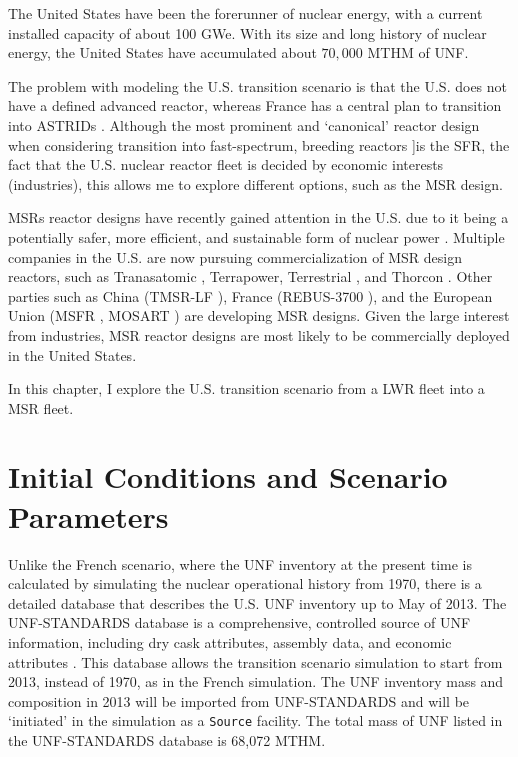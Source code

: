 
The United States have been the forerunner of nuclear energy, with a current
installed capacity of about 100 GWe. With its size and long history of nuclear
energy, the United States have accumulated about $70,000$ \gls{MTHM} of \gls{UNF}.

The problem with modeling the U.S. transition scenario is that the U.S. does not have
a defined advanced reactor, whereas France has a central plan to transition into \glspl{ASTRID} \cite{boullis_french_2015, varaine_pre-conceptual_2012}.
Although the most prominent and `canonical' reactor design when considering
transition into fast-spectrum, breeding reactors ]is the \gls{SFR},
the fact that the U.S. nuclear reactor fleet
is decided by economic interests (industries), this allows me to explore
different options, such as the \gls{MSR} design.

\glspl{MSR} reactor designs have recently gained attention in the U.S. due to it being a
potentially safer, more efficient, and sustainable form of nuclear power
\cite{serp_molten_2014}. Multiple companies in the U.S. are now pursuing
commercialization of \gls{MSR} design reactors, such as Tranasatomic \cite{transatomic_power_corporation_technical_2016}
, Terrapower, Terrestrial \cite{leblanc_18_2017}, and
Thorcon \cite{jorgensen_19_2017}. Other parties such as China (TMSR-LF \cite{dai_17_2017}),
France (REBUS-3700 \cite{mourogov_potentialities_2006}),
and the European Union (MSFR \cite{heuer_towards_2014}, MOSART \cite{ignatiev_molten_2014})
are developing \gls{MSR} designs. Given the large interest from industries,
\gls{MSR} reactor designs are
most likely to be commercially deployed in the United States.

In this chapter, I explore the U.S. transition scenario
from a \gls{LWR} fleet into a \gls{MSR} fleet.

\section{Initial Conditions and Scenario Parameters}
Unlike the French scenario,
where the \gls{UNF} inventory at the present time is calculated by
simulating the nuclear operational history from 1970, there is a
detailed database that describes the U.S. \gls{UNF} inventory up to May of 2013.
The \gls{UNF-STANDARDS} database is a comprehensive,
controlled source of \gls{UNF} information, including dry cask attributes, assembly
data, and economic attributes \cite{peterson_unf-st&dards_2017}. This database
allows the transition scenario simulation to start from 2013, instead of 1970,
as in the French simulation. The \gls{UNF} inventory mass and composition in 2013
will be imported from \gls{UNF-STANDARDS} and will be `initiated' in the simulation
as a \texttt{Source} facility. The total mass of \gls{UNF} listed
in the \gls{UNF-STANDARDS} database is 68,072 MTHM.

